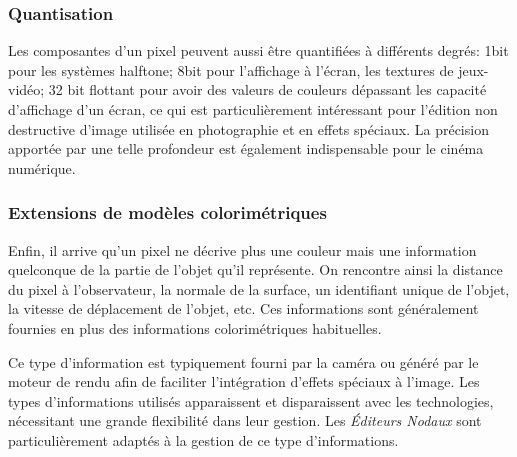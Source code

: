 			\subsubsection{Quantisation}
			Les composantes d'un pixel peuvent aussi être quantifiées à différents degrés: 1bit pour les systèmes halftone; 8bit pour l'affichage 
			à l'écran,  les textures de jeux-vidéo; 32 bit flottant pour avoir des valeurs de couleurs dépassant les capacité d'affichage
			d'un écran, ce qui est particulièrement intéressant pour l'édition non destructive d'image utilisée en photographie et en 
			effets spéciaux. La précision apportée par une telle profondeur est également indispensable pour le cinéma numérique.

			\subsubsection{Extensions de modèles colorimétriques}

			Enfin, il arrive qu'un pixel ne décrive plus une couleur mais une information quelconque de la partie de l'objet qu'il représente.
			On rencontre ainsi la distance du pixel à l'observateur, la normale de la surface, un identifiant unique de l'objet, la vitesse de
			déplacement de l'objet, etc. Ces informations sont généralement fournies en plus des informations colorimétriques habituelles.

			Ce type d'information est typiquement fourni par la caméra ou généré par le moteur de rendu afin de faciliter l'intégration d'effets
			spéciaux à l'image. Les types d'informations utilisés apparaissent et disparaissent avec les technologies, nécessitant une grande 
			flexibilité dans leur gestion. Les \emph{Éditeurs Nodaux} sont particulièrement adaptés à la gestion de ce type d'informations.
			

